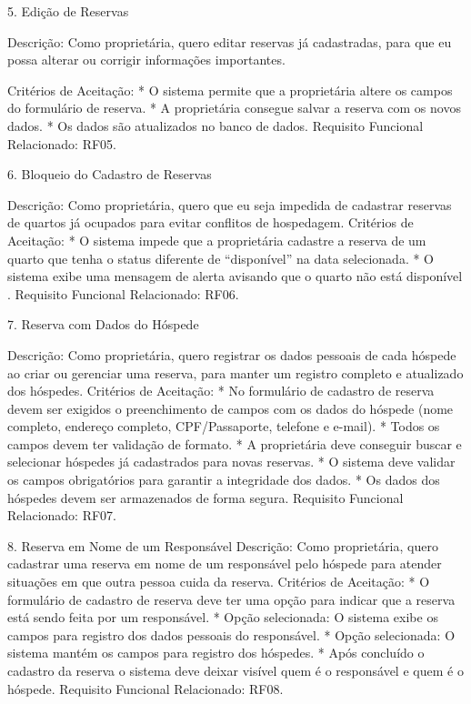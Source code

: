 5. Edição de Reservas


Descrição: Como proprietária,  quero editar reservas já cadastradas,  para que eu possa alterar ou corrigir informações importantes.


Critérios de Aceitação:
* O sistema permite que a proprietária altere os campos do formulário de reserva.
* A proprietária consegue salvar a reserva com os novos dados.
* Os dados são atualizados no banco de dados.
Requisito Funcional Relacionado: RF05.


6. Bloqueio do Cadastro de Reservas 


Descrição: Como proprietária, quero que eu seja impedida de cadastrar reservas de quartos já ocupados para evitar conflitos de hospedagem.
Critérios de Aceitação:
* O sistema impede que a proprietária cadastre a reserva de um quarto que tenha o status diferente de “disponível” na data selecionada.
* O sistema exibe uma mensagem de alerta avisando que o quarto não está disponível .
Requisito Funcional Relacionado: RF06.




7. Reserva com Dados do Hóspede


Descrição: Como proprietária, quero registrar os dados pessoais de cada hóspede ao criar ou gerenciar uma reserva, para manter um registro completo e atualizado dos hóspedes.
Critérios de Aceitação:
* No formulário de cadastro de reserva devem ser exigidos o preenchimento de campos com os dados do hóspede (nome completo, endereço completo, CPF/Passaporte, telefone e e-mail).
* Todos os campos devem ter validação de formato.
* A proprietária deve conseguir buscar e selecionar hóspedes já cadastrados para novas reservas.
* O sistema deve validar os campos obrigatórios para garantir a integridade dos dados.
* Os dados dos hóspedes devem ser armazenados de forma segura.
Requisito Funcional Relacionado: RF07.




8. Reserva em Nome de um Responsável
Descrição: Como proprietária, quero cadastrar uma reserva em nome de um responsável pelo hóspede para atender situações em que outra pessoa cuida da reserva.
Critérios de Aceitação:
* O formulário de cadastro de reserva deve ter uma opção para indicar que a reserva está sendo feita por um responsável.
* Opção selecionada: O sistema exibe os campos para registro dos dados pessoais do responsável. 
* Opção selecionada: O sistema mantém os campos para registro dos hóspedes.
* Após concluído o cadastro da reserva o sistema deve deixar visível quem é o responsável e quem é o hóspede.
Requisito Funcional Relacionado: RF08.




